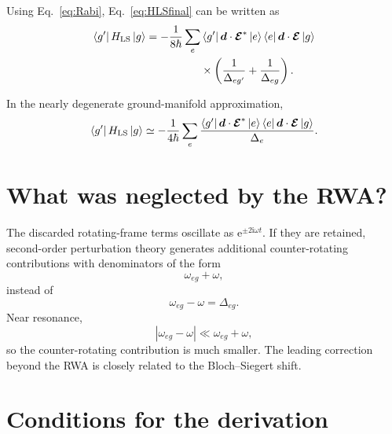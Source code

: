 \documentclass[11pt]{article}
\newcommand{\ee}{\mathrm{e}}
\newcommand{\ii}{\mathrm{i}}
\newcommand{\HLS}{H_{\mathrm{LS}}}
\begin{document}
Using Eq.~\eqref{eq:Rabi}, Eq.~\eqref{eq:HLSfinal} can be written as
\begin{align}
\bra{g'}\HLS\ket{g}
=
-\frac{1}{8\hbar}
\sum_e
&\bra{g'}\bm d\cdot\bm{\mathcal E}^{*}\ket{e}
\bra{e}\bm d\cdot\bm{\mathcal E}\ket{g}
\nonumber\\
&\times
\left(
\frac{1}{\Delta_{eg'}}
+
\frac{1}{\Delta_{eg}}
\right).
\label{eq:HLSdipole}
\end{align}

In the nearly degenerate ground-manifold approximation,
\begin{equation}
\bra{g'}\HLS\ket{g}
\simeq
-\frac{1}{4\hbar}
\sum_e
\frac{
\bra{g'}\bm d\cdot\bm{\mathcal E}^{*}\ket{e}
\bra{e}\bm d\cdot\bm{\mathcal E}\ket{g}
}{\Delta_e}.
\label{eq:HLSdipoledeg}
\end{equation}

\section{What was neglected by the RWA?}

The discarded rotating-frame terms oscillate as $\ee^{\pm2\ii\omega t}$. If they are retained, second-order perturbation theory generates additional counter-rotating contributions with denominators of the form
\begin{equation}
\omega_{eg}+\omega,
\label{eq:counterden}
\end{equation}
instead of
\begin{equation}
\omega_{eg}-\omega=\Delta_{eg}.
\label{eq:rotden}
\end{equation}
Near resonance,
\begin{equation}
|\omega_{eg}-\omega|\ll \omega_{eg}+\omega,
\label{eq:dencompare}
\end{equation}
so the counter-rotating contribution is much smaller. The leading correction beyond the RWA is closely related to the Bloch--Siegert shift.

\section{Conditions for the derivation}
\end{document}
